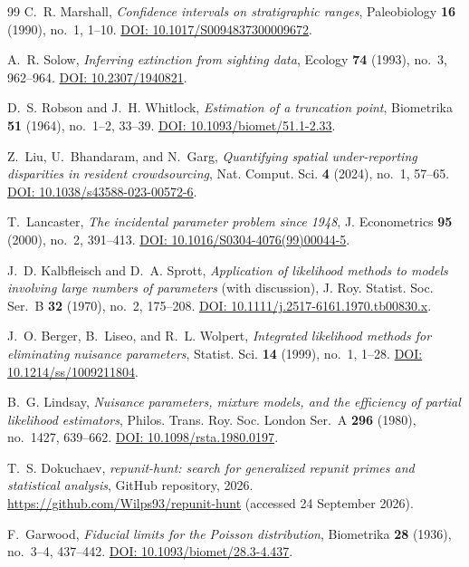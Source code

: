 \documentclass[11pt,a4paper]{article}
\theoremstyle{plain}
\theoremstyle{remark}
\begin{document}
\begin{thebibliography}{99}
 C.~R. Marshall, \emph{Confidence intervals on
stratigraphic ranges}, Paleobiology \textbf{16} (1990), no.~1, 1--10.
\href{https://doi.org/10.1017/S0094837300009672}{DOI:
10.1017/S0094837300009672}.

 A.~R. Solow, \emph{Inferring extinction from sighting data},
Ecology \textbf{74} (1993), no.~3, 962--964.
\href{https://doi.org/10.2307/1940821}{DOI: 10.2307/1940821}.

 D.~S. Robson and J.~H. Whitlock, \emph{Estimation
of a truncation point}, Biometrika \textbf{51} (1964), no.~1--2, 33--39.
\href{https://doi.org/10.1093/biomet/51.1-2.33}{DOI:
10.1093/biomet/51.1-2.33}.

 Z.~Liu, U.~Bhandaram, and N.~Garg, \emph{Quantifying spatial
under-reporting disparities in resident crowdsourcing}, Nat. Comput. Sci.
\textbf{4} (2024), no.~1, 57--65.
\href{https://doi.org/10.1038/s43588-023-00572-6}{DOI:
10.1038/s43588-023-00572-6}.

 T.~Lancaster, \emph{The incidental parameter problem
since 1948}, J. Econometrics \textbf{95} (2000), no.~2, 391--413.
\href{https://doi.org/10.1016/S0304-4076(99)00044-5}{DOI:
10.1016/S0304-4076(99)00044-5}.

 J.~D. Kalbfleisch and D.~A. Sprott,
\emph{Application of likelihood methods to models involving large numbers of
parameters} (with discussion), J. Roy. Statist. Soc. Ser.~B \textbf{32} (1970),
no.~2, 175--208.
\href{https://doi.org/10.1111/j.2517-6161.1970.tb00830.x}{DOI:
10.1111/j.2517-6161.1970.tb00830.x}.

 J.~O. Berger, B.~Liseo, and R.~L. Wolpert,
\emph{Integrated likelihood methods for eliminating nuisance parameters},
Statist. Sci. \textbf{14} (1999), no.~1, 1--28.
\href{https://doi.org/10.1214/ss/1009211804}{DOI: 10.1214/ss/1009211804}.

 B.~G. Lindsay, \emph{Nuisance parameters, mixture models,
and the efficiency of partial likelihood estimators}, Philos. Trans. Roy. Soc.
London Ser.~A \textbf{296} (1980), no.~1427, 639--662.
\href{https://doi.org/10.1098/rsta.1980.0197}{DOI: 10.1098/rsta.1980.0197}.

 T.~S. Dokuchaev, \emph{repunit-hunt: search for
generalized repunit primes and statistical analysis}, GitHub repository, 2026.
\url{https://github.com/Wilps93/repunit-hunt} (accessed 24 September 2026).

 F.~Garwood, \emph{Fiducial limits for the Poisson
distribution}, Biometrika \textbf{28} (1936), no.~3--4, 437--442.
\href{https://doi.org/10.1093/biomet/28.3-4.437}{DOI:
10.1093/biomet/28.3-4.437}.

\end{thebibliography}
\end{document}

